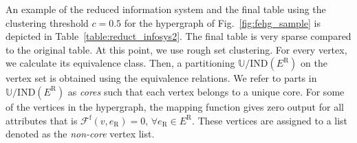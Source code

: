 \documentclass[twocolumn]{svjour3}          \smartqed
\begin{document}
An example of the reduced information system and the final table using the clustering threshold $c=0.5$ for the hypergraph of Fig.~\ref{fig:fehg_sample} is depicted in Table~\ref{table:reduct_infosys2}. The final table is very sparse compared to the original table. At this point, we use rough set clustering. For every vertex, we calculate its equivalence class. Then, a partitioning $\mathbb{U}/\text{IND}(E^{\mathrm{R}})$ on the vertex set is obtained using the equivalence relations. We refer to parts in $\mathbb{U}/\text{IND}(E^{\mathrm{R}})$ as \textit{cores} such that each vertex belongs to a unique core. For some of the vertices in the hypergraph, the mapping function gives zero output for all attributes that is $\mathcal{F}^{\mathrm{f}}(v,e_{\mathrm{R}})=0, \, \forall e_{\mathrm{R}} \in E^{\mathrm{R}}$. These vertices are assigned to a list denoted as the \textit{non-core} vertex list. 
\end{document}
